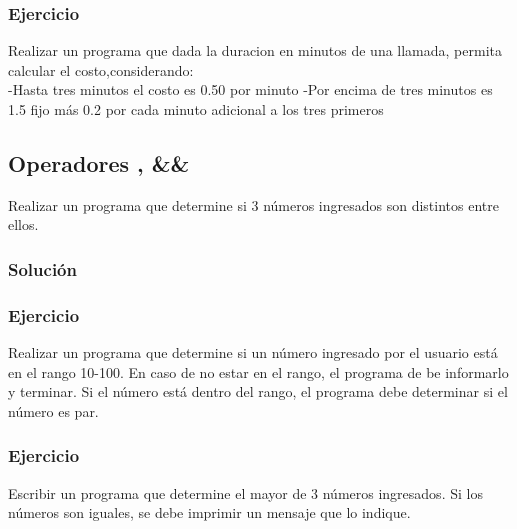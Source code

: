 \subsubsection{Ejercicio}
Realizar un programa que dada la duracion en minutos de una llamada, permita calcular el costo,considerando:\\
-Hasta tres minutos el costo es 0.50 por minuto
-Por encima de tres minutos es 1.5 fijo más 0.2 por cada minuto adicional a los tres primeros
{\small
  \lstset{inputencoding=utf8/latin1}
  
}

\subsection*{Operadores \textbar\textbar, \&\&}
Realizar un programa que determine si 3 números ingresados son distintos entre ellos.
\subsubsection{Solución}

\lstset{inputencoding=utf8/latin1}

{\small
  \lstset{inputencoding=utf8/latin1}
}

\subsubsection{Ejercicio}
Realizar un programa que determine si un número ingresado por el usuario está en el rango 10-100. En caso de no estar en el rango, el programa de be informarlo y terminar. Si el número está dentro del rango, el programa debe determinar si el número es par.
{\small
  \lstset{inputencoding=utf8/latin1}
  
}

\subsubsection{Ejercicio}
Escribir un programa que determine el mayor de 3 números ingresados. Si los números son iguales, se debe imprimir un mensaje que lo indique.
{\small
  \lstset{inputencoding=utf8/latin1}
  
}

